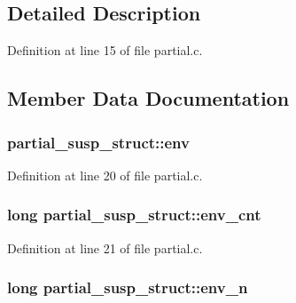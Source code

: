 \subsection{Detailed Description}


Definition at line 15 of file partial.\+c.



\subsection{Member Data Documentation}
\subsubsection[{\texorpdfstring{env}{env}}]{ partial\+\_\+susp\+\_\+struct\+::env}\hypertarget{structpartial__susp__struct_a308009ae9a96854c2071a9badae7e284}{}\label{structpartial__susp__struct_a308009ae9a96854c2071a9badae7e284}


Definition at line 20 of file partial.\+c.

\subsubsection[{\texorpdfstring{env\+\_\+cnt}{env_cnt}}]{\setlength{\rightskip}{0pt plus 5cm}long partial\+\_\+susp\+\_\+struct\+::env\+\_\+cnt}\hypertarget{structpartial__susp__struct_a4e6b28037495dc5ae90437f5fe17b35c}{}\label{structpartial__susp__struct_a4e6b28037495dc5ae90437f5fe17b35c}


Definition at line 21 of file partial.\+c.

\subsubsection[{\texorpdfstring{env\+\_\+n}{env_n}}]{\setlength{\rightskip}{0pt plus 5cm}long partial\+\_\+susp\+\_\+struct\+::env\+\_\+n}\hypertarget{structpartial__susp__struct_a620ceda4768e7da0ed42ebba77453450}{}\label{structpartial__susp__struct_a620ceda4768e7da0ed42ebba77453450}


